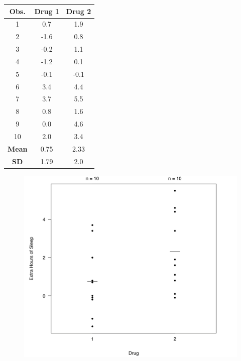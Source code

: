 \documentclass[14pt]{extarticle}
\begin{document}
\begin{center}
\begin{tabular}{ c c c }
\hline
\textbf{Obs.} & \textbf{Drug 1} & \textbf{Drug 2} \\
\hline
1  & 0.7  & 1.9 \\
2  & -1.6 & 0.8 \\
3  & -0.2 & 1.1 \\
4  & -1.2 & 0.1 \\
5  & -0.1 & -0.1 \\
6  & 3.4  & 4.4 \\
7  & 3.7  & 5.5 \\
8  & 0.8  & 1.6 \\
9  & 0.0  & 4.6 \\
10 & 2.0  & 3.4 \\
\hline
\textbf{Mean} & 0.75 & 2.33 \\
\textbf{SD}   & 1.79 & 2.0 \\
\hline
\end{tabular}
\end{center}

\begin{figure}[H]
    \centering
    \includegraphics[width=1\textwidth]{fig20.png}
\end{figure}
\end{document}
